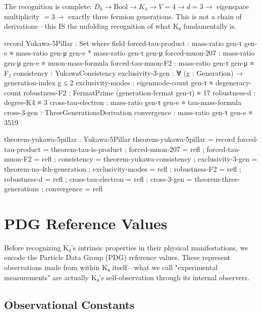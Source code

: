 \documentclass[11pt,a4paper]{book}
\begin{document}
The recognition is complete: $D_0 \to \text{Bool} \to K_4 \to V = 4 \to d = 3 \to $ 
eigenspace multiplicity $= 3 \to$ exactly three fermion generations. This is not a chain of derivations—this IS the unfolding recognition of what K₄ fundamentally is.

\begin{code}
record Yukawa-5Pillar : Set where
  field
    forced-tau-product   : mass-ratio gen-τ gen-e ≡ mass-ratio gen-μ gen-e * mass-ratio gen-τ gen-μ
    forced-muon-207      : mass-ratio gen-μ gen-e ≡ muon-mass-formula
    forced-tau-muon-F2   : mass-ratio gen-τ gen-μ ≡ F₂
    consistency          : YukawaConsistency
    exclusivity-3-gen    : ∀ (g : Generation) → generation-index g ≤ 2
    exclusivity-modes    : eigenmode-count gen-τ ≡ degeneracy-count
    robustness-F2        : FermatPrime (generation-fermat gen-τ) ≡ 17
    robustness-d         : degree-K4 ≡ 3
    cross-tau-electron   : mass-ratio gen-τ gen-e ≡ tau-mass-formula
    cross-3-gen          : ThreeGenerationsDerivation
    convergence          : mass-ratio gen-τ gen-e ≡ 3519

theorem-yukawa-5pillar : Yukawa-5Pillar
theorem-yukawa-5pillar = record
  { forced-tau-product   = theorem-tau-is-product
  ; forced-muon-207      = refl
  ; forced-tau-muon-F2   = refl
  ; consistency          = theorem-yukawa-consistency
  ; exclusivity-3-gen    = theorem-no-4th-generation
  ; exclusivity-modes    = refl
  ; robustness-F2        = refl
  ; robustness-d         = refl
  ; cross-tau-electron   = refl
  ; cross-3-gen          = theorem-three-generations
  ; convergence          = refl
  }
\end{code}


\chapter{PDG Reference Values}
\label{chap:pdg-values}

Before recognizing K₄'s intrinsic properties in their physical manifestations, we encode the Particle Data Group (PDG) reference values. These represent observations made from within K₄ itself—what we call "experimental measurements" are actually K₄'s self-observation through its internal observers.

\section{Observational Constants}
\end{document}
